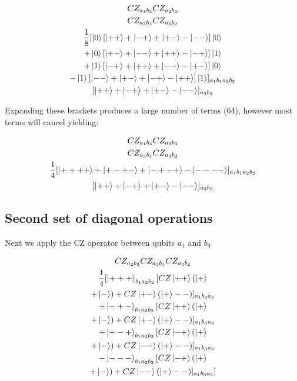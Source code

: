  
\begin{multline*}
CZ _{a_{1} b_{3}} CZ _{a_{2} b_{3}} \\
CZ _{a_{3} b_{1}} CZ _{a_{3} b_{2}} \\
\frac{1}{8}
 [\ket{0} [ \ket{+ +} + \ket{- +} + \ket{+ -} - \ket{- -} ] \ket{0} \\
+ \ket{0} [ \ket{+ -} + \ket{- -} + \ket{+ +} - \ket{- +} ] \ket{1} \\
+ \ket{1} [ \ket{- +} + \ket{+ +} + \ket{- -} - \ket{+ -} ] \ket{0} \\
- \ket{1} [ \ket{- -} + \ket{+ -} + \ket{- +} - \ket{+ +} ] \ket{1}] _{a_{1} b_{1} a_{2} b_{2}} \\
[ \ket{+ +} + \ket{- +} + \ket{+ -} - \ket{- -} ] _{a_{3} b_{3}} \\
\end{multline*}

Expanding these brackets produces a large number of terms (64), however most terms will cancel yielding:

\begin{multline*}
CZ _{a_{1} b_{3}} CZ _{a_{2} b_{3}} \\
CZ _{a_{3} b_{1}} CZ _{a_{3} b_{2}} \\
\frac{1}{4}
[\ket{+ + + +} + \ket{+ - + -} + \ket{- + - +} - \ket{- - - -}] _{a_{1} b_{1} a_{2} b_{2}} \\
[ \ket{+ +} + \ket{- +} + \ket{+ -} - \ket{- -} ] _{a_{3} b_{3}} \\
\end{multline*}




\subsection{Second set of diagonal operations}

Next we apply the CZ operator between qubits $a_{1}$ and $b_{3}$

\begin{multline*}
CZ _{a_{2} b_{3}} CZ _{a_{3} b_{1}} CZ _{a_{3} b_{2}} \\
\frac{1}{4}
 [\ket{+ + +} _{b_{1} a_{2} b_{2}} [CZ \ket{+ +} (\ket{+} \\
 + \ket{-}) + CZ \ket{+ -} (\ket{+} - {-})] _{a_{1} b_{3} a_{3}} \\
+ \ket{- + -} _{b_{1} a_{2} b_{2}} [CZ \ket{+ +} (\ket{+} \\
+ \ket{-}) + CZ \ket{+ -} (\ket{+} - {-})] _{a_{1} b_{3} a_{3}} \\
+ \ket{+ - +} _{b_{1} a_{2} b_{2}} [CZ \ket{- +} (\ket{+} \\
+ \ket{-}) + CZ \ket{- -} (\ket{+} - {-})] _{a_{1} b_{3} a_{3}} \\
- \ket{- - -} _{b_{1} a_{2} b_{2}} [CZ \ket{- +} (\ket{+} \\
+ \ket{-}) + CZ \ket{- -} (\ket{+} - {-})] _{a_{1} b_{3} a_{3}}] \\
\end{multline*}

